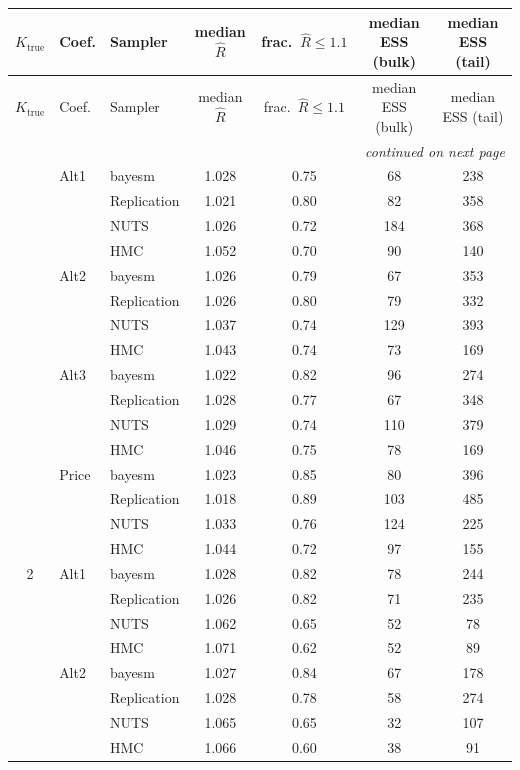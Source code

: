 \begin{longtable}{cllcccc}
\toprule
$K_{\text{true}}$ & Coef. & Sampler & median $\widehat{R}$ & frac.\ $\widehat{R}\leq1.1$ & median ESS (bulk) & median ESS (tail) \\
\midrule
\endfirsthead
\toprule
$K_{\text{true}}$ & Coef. & Sampler & median $\widehat{R}$ & frac.\ $\widehat{R}\leq1.1$ & median ESS (bulk) & median ESS (tail) \\
\midrule
\endhead
\midrule
\multicolumn{7}{r}{\emph{continued on next page}} \\
\endfoot
\bottomrule
\endlastfoot
1 & Alt1 & bayesm & 1.028 & 0.75 & 68 & 238 \\
 &  & Replication & 1.021 & 0.80 & 82 & 358 \\
 &  & NUTS & 1.026 & 0.72 & 184 & 368 \\
 &  & HMC & 1.052 & 0.70 & 90 & 140 \\
 & Alt2 & bayesm & 1.026 & 0.79 & 67 & 353 \\
 &  & Replication & 1.026 & 0.80 & 79 & 332 \\
 &  & NUTS & 1.037 & 0.74 & 129 & 393 \\
 &  & HMC & 1.043 & 0.74 & 73 & 169 \\
 & Alt3 & bayesm & 1.022 & 0.82 & 96 & 274 \\
 &  & Replication & 1.028 & 0.77 & 67 & 348 \\
 &  & NUTS & 1.029 & 0.74 & 110 & 379 \\
 &  & HMC & 1.046 & 0.75 & 78 & 169 \\
 & Price & bayesm & 1.023 & 0.85 & 80 & 396 \\
 &  & Replication & 1.018 & 0.89 & 103 & 485 \\
 &  & NUTS & 1.033 & 0.76 & 124 & 225 \\
 &  & HMC & 1.044 & 0.72 & 97 & 155 \\
2 & Alt1 & bayesm & 1.028 & 0.82 & 78 & 244 \\
 &  & Replication & 1.026 & 0.82 & 71 & 235 \\
 &  & NUTS & 1.062 & 0.65 & 52 & 78 \\
 &  & HMC & 1.071 & 0.62 & 52 & 89 \\
 & Alt2 & bayesm & 1.027 & 0.84 & 67 & 178 \\
 &  & Replication & 1.028 & 0.78 & 58 & 274 \\
 &  & NUTS & 1.065 & 0.65 & 32 & 107 \\
 &  & HMC & 1.066 & 0.60 & 38 & 91 \\

\end{longtable}
